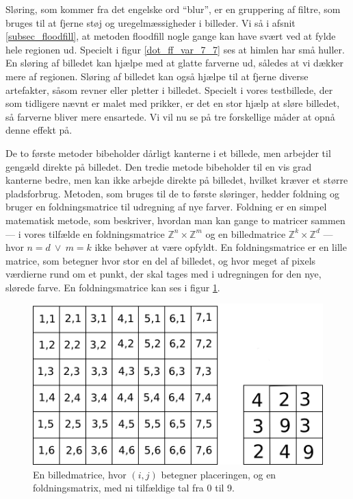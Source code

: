 {
Sløring, som kommer fra det engelske ord ``blur'', er en gruppering af
filtre, som bruges til at fjerne støj og uregelmæssigheder i billeder.
Vi så i afsnit \ref{subsec_floodfill}, at metoden floodfill nogle gange
kan have svært ved at fylde hele regionen ud. Specielt i figur
\ref{dot_ff_var_7_7} ses at himlen har små huller. En sløring af
billedet kan hjælpe med at glatte farverne ud, således at vi dækker mere
af regionen. Sløring af billedet kan også hjælpe til at fjerne diverse
artefakter, såsom revner eller pletter i billedet. Specielt i vores
testbillede, der som tidligere nævnt er malet med prikker, er det en
stor hjælp at sløre billedet, så farverne bliver mere ensartede. Vi vil
nu se på tre forskellige måder at opnå denne effekt på.

De to første metoder bibeholder dårligt kanterne i et billede, men
arbejder til gengæld direkte på billedet. Den tredie metode bibeholder
til en vis grad kanterne bedre, men kan ikke arbejde direkte på
billedet, hvilket kræver et større pladsforbrug. Metoden, som bruges til
de to første sløringer, hedder foldning og bruger en foldningsmatrice til
udregning af nye farver. Foldning er en simpel matematisk metode, som
beskriver, hvordan man kan gange to matricer sammen --- i vores tilfælde
en foldningsmatrice $\mathbb{Z}^{n}\times{} \mathbb{Z}^{m}$ og en
billedmatrice $\mathbb{Z}^{k}\times{} \mathbb{Z}^{d}$ --- hvor $n = d ~\vee~
m = k$ ikke behøver at være opfyldt.  En foldningsmatrice er en lille
matrice, som betegner hvor stor en del af billedet, og hvor meget af
pixels værdierne rund om et punkt, der skal tages med i udregningen for
den nye, slørede farve. En foldningsmatrice kan ses i figur \ref{Foldning}.
\begin{figure}[h]
	\begin{center}
		\includegraphics[scale=1,angle=0]{afsnit/vores_implementation/billeder/sloering/convolution}
	\end{center}
    \caption[]{En billedmatrice, hvor $(i,j)$ betegner placeringen, og en
    foldningsmatrix, med ni tilfældige tal fra 0 til 9.}
	\label{Foldning}
\end{figure}

}
